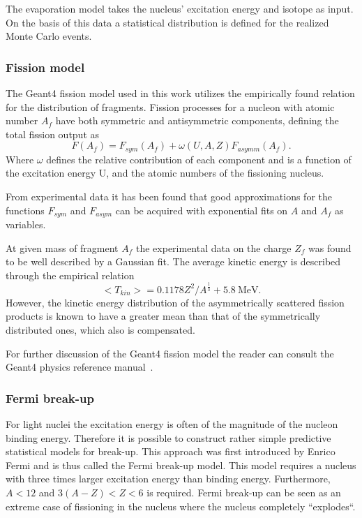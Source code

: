 The evaporation model takes the nucleus' excitation energy and isotope as input. On the basis of this data a statistical distribution is defined for the realized Monte Carlo events.

\subsubsection{Fission model}

The Geant4 fission model used in this work utilizes the empirically found relation for the distribution of fragments. Fission processes for a nucleon with atomic number $A_f$ have both symmetric and antisymmetric components, defining the total fission output as
\begin{equation}
 F(A_f) = F_{sym}(A_f) + \omega(U,A,Z) F_{asymm}(A_f).
\label{fissionSymmetricAsymmetric}
\end{equation}
Where $\omega$ defines the relative contribution of each component and is a function of the excitation energy U, and the atomic numbers of the fissioning nucleus.

From experimental data it has been found that good approximations for the functions $F_{sym}$ and $F_{asym}$ can be acquired with exponential fits on $A$ and $A_f$ as variables.

At given mass of fragment $A_f$ the experimental data on the charge $Z_f$ was found to be well described by a Gaussian fit. The average kinetic energy is described through the empirical relation \begin{equation}<T_{kin}>=0.1178Z^2/A^\frac{1}{3} + 5.8~\text{MeV.}\end{equation}However, the kinetic energy distribution of the asymmetrically scattered fission products is known to have a greater mean than that of the symmetrically distributed ones, which also is compensated.

For further discussion of the Geant4 fission model the reader can consult the Geant4 physics reference manual~\cite{physicsManual}. %

\subsubsection{Fermi break-up}

For light nuclei the excitation energy is often of the magnitude of the nucleon binding energy. Therefore it is possible to construct rather simple predictive statistical models for break-up. This approach was first introduced by Enrico Fermi and is thus called the Fermi break-up model. This model requires a nucleus with three times larger excitation energy than binding energy. Furthermore, $A < 12$ and $3(A - Z) < Z < 6$ is required. Fermi break-up can be seen as an extreme case of fissioning in the nucleus where the nucleus completely ``explodes``. %
\clearpage

